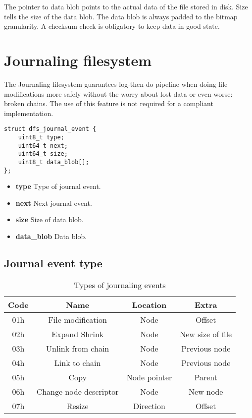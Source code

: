 \documentclass[12pt]{article}
\begin{document}
The pointer to data blob points to the actual data of the file stored in disk. Size tells the size of the data blob. The data blob is always padded to the bitmap granularity. A checksum check is obligatory to keep data in good state.

\newpage

\section{Journaling filesystem}

The Journaling filesystem guarantees log-then-do pipeline when doing file modifications more safely without the worry about lost data or even worse: broken chains. The use of this feature is not required for a compliant implementation.

\begin{verbatim}
struct dfs_journal_event {
	uint8_t type;
	uint64_t next;
	uint64_t size;
	uint8_t data_blob[];
};
\end{verbatim}

\begin{itemize}
	\item \textbf{type} Type of journal event.
	\item \textbf{next} Next journal event.
	\item \textbf{size} Size of data blob.
	\item \textbf{data\_blob} Data blob.
\end{itemize}

\newpage

\subsection{Journal event type}

\begin{table}
\centering
\begin{tabular}{ |c|c|c|c| }
\hline
Code & Name & Location & Extra \\
\hline
01h & File modification & Node & Offset \\
02h & Expand Shrink & Node & New size of file \\
03h & Unlink from chain & Node & Previous node \\
04h & Link to chain & Node & Previous node \\
05h & Copy & Node pointer & Parent \\
06h & Change node descriptor & Node & New node \\
07h & Resize & Direction & Offset \\
\hline
\end{tabular}
\caption{Types of journaling events}
\end{table}
\end{document}
